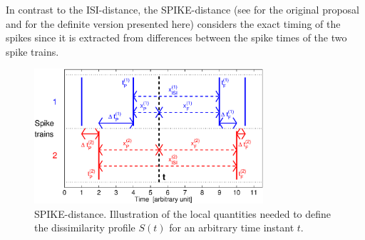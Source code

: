 \documentclass[10pt,twocolumn]{elsart5p}
\begin{document}
\begin{appendix}
In contrast to the ISI-distance, the SPIKE-distance (see \citet{Kreuz11} for the original proposal and \citet{Kreuz13, Kreuz12} for the definite version presented here) considers the exact timing of the spikes since it is extracted from differences between the spike times of the two spike trains. 
%
%
\begin{figure}
    \includegraphics[width=85mm]{App_Fig2_SPIKE_Illustration.eps}
    \caption{\abb\label{fig:App-Fig2-SPIKE-Illustration} SPIKE-distance. Illustration of the local
	    quantities needed to define the dissimilarity profile $S (t)$ for an arbitrary time 
    		instant $t$.}
\end{figure}
%


\end{appendix}
\end{document}

